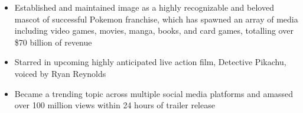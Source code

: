\documentclass[10pt,a4paper,ragged2e]{altacv}
\begin{document}

\begin{fullwidth}
\makecvheader
\end{fullwidth}










\medskip




\begin{itemize}
\item Established and maintained image as a highly recognizable and beloved mascot of successful Pokemon franchise, which has spawned an array of media including video games, movies, manga, books, and card games, totalling over \$70 billion of revenue
\end{itemize}

\divider

\begin{itemize}
\item Starred in upcoming highly anticipated live action film, Detective Pikachu, voiced by Ryan Reynolds
\item Became a trending topic across multiple social media platforms and amassed over 100 million views within 24 hours of trailer release
\end{itemize}
\end{document}
